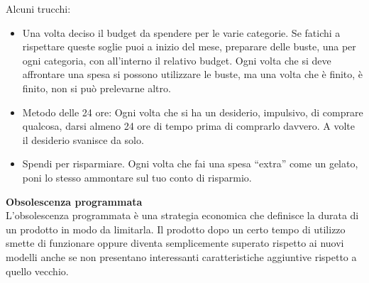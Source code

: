 \documentclass[12pt]{book} %
\begin{document}
\bigskip

Alcuni trucchi:

\begin{itemize}
\item Una volta deciso il budget da spendere per le varie categorie. Se fatichi a rispettare queste soglie puoi a inizio
del mese, preparare delle buste, una per ogni categoria, con all'interno il relativo budget. Ogni
volta che si deve affrontare una spesa si possono utilizzare le buste, ma una volta che è finito, è finito, non si può
prelevarne altro.
\item Metodo delle 24 ore: Ogni volta che si ha un desiderio, impulsivo, di comprare qualcosa, darsi almeno 24 ore di
tempo prima di comprarlo davvero. A volte il desiderio svanisce da solo.
\item Spendi per risparmiare. Ogni volta che fai una spesa “extra” come un gelato, poni lo stesso ammontare sul tuo
conto di risparmio.
\end{itemize}

\needspace{14cm}
\noindent \textbf{\large Obsolescenza programmata} \\
L'obsolescenza programmata è una strategia economica che definisce la durata di un prodotto in modo
da limitarla. Il prodotto dopo un certo tempo di utilizzo smette di funzionare oppure diventa semplicemente superato
rispetto ai nuovi modelli anche se non presentano interessanti caratteristiche aggiuntive rispetto a quello vecchio.
\end{document}
